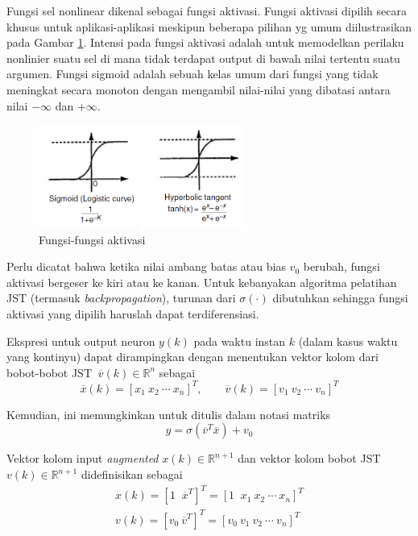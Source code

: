 Fungsi sel nonlinear dikenal sebagai fungsi aktivasi. Fungsi aktivasi dipilih secara khusus untuk aplikasi-aplikasi meskipun beberapa pilihan yg umum diilustrasikan pada Gambar \ref{fig:3:activation}. Intensi pada fungsi aktivasi adalah untuk memodelkan perilaku nonlinier suatu sel di mana tidak terdapat output di bawah nilai tertentu suatu argumen. Fungsi sigmoid adalah sebuah kelas umum dari fungsi yang tidak meningkat secara monoton dengan mengambil nilai-nilai yang dibatasi antara nilai $-\infty$ dan $+\infty$. 
\begin{figure}[!h]
	\centering
	\includegraphics[width=0.6\textwidth]{figures/activationFunction}
	\caption{Fungsi-fungsi aktivasi \cite{NNControlBook}}
	\label{fig:3:activation}
\end{figure}
Perlu dicatat bahwa ketika nilai ambang batas atau bias $v_0$ berubah, fungsi aktivasi bergeser ke kiri atau ke kanan. Untuk kebanyakan algoritma pelatihan JST (termasuk \textit{backpropagation}), turunan dari $\sigma(\cdot)$ dibutuhkan sehingga fungsi aktivasi yang dipilih haruslah dapat terdiferensiasi. \cite{NNControlBook}

Ekspresi untuk output neuron $y(k)$ pada waktu instan $k$ (dalam kasus waktu yang kontinyu) dapat dirampingkan dengan menentukan vektor kolom dari bobot-bobot JST $\ \overline{v}(k) \in \mathbb{R}^n $ sebagai
\vspace{-1em}
\begin{equation} \label{eq:3:vektorKolom}
\overline{x}(k) = [x_1\ x_2\ \cdots\ x_n]^T, \qquad \overline{v}(k) = [v_1\ v_2\ \cdots\ v_n]^T
\end{equation}

Kemudian, ini memungkinkan untuk ditulis dalam notasi matriks
\vspace{-1em}
\begin{equation} \label{eq:3:matriksy}
y = \sigma(\overline{v}^T\overline{x}) + v_0
\end{equation}

Vektor kolom input \textit{augmented} $x(k) \in \mathbb{R}^{n+1} $ dan vektor kolom bobot JST $v(k) \in \mathbb{R}^{n+1} $ didefinisikan sebagai
\vspace{-1em}
\begin{equation} \label{eq:3:matriksaugmented}
\begin{split}
x(k) = [1\;\; \overline{x}^T]^T = [1\;\; x_1\ x_2\ \cdots\ x_n]^T \\
v(k) = [v_0\ \overline{v}^T]^T = [v_0\ v_1\ v_2\ \cdots\ v_n]^T
\end{split}
\end{equation}

